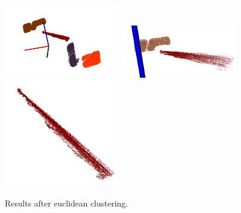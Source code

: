 \documentclass[12pt]{drexelthesis}
\begin{document}
\begin{figure}[!ht]
	\centering
		\includegraphics[width=2in]{images/real-lab-scans/euclidean0.png}
		\includegraphics[width=2in]{images/real-lab-scans/euclidean1.png}
		\includegraphics[width=2in]{images/real-lab-scans/euclidean2.png}
		\caption[Euclidean clustering results on HDL-32E LiDAR scans]{\centering Results after euclidean clustering.}
	\label{lidarresults:euclidean}
\end{figure}
\end{document}
